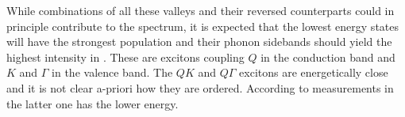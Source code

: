 While combinations of all these valleys and their reversed counterparts could in principle contribute to the \pl spectrum, it is expected that the lowest energy states will have the strongest population and their phonon sidebands should yield the highest intensity in \pl\!. These are excitons coupling $Q$ in the conduction band and $K$ and $\Gamma$ in the valence band. The $QK$ and $Q\Gamma$ excitons are energetically close and it is not clear a-priori how they are ordered. According to measurements in  \cite{lindlau_role_2017} the latter one has the lower energy. 